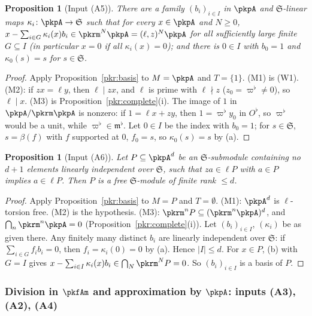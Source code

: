 \documentclass[10pt]{amsart}
\newtheorem{proposition}[theorem]{Proposition}
\theoremstyle{definition}
\theoremstyle{remark}
\begin{document}
\begin{proposition}[Input (A5)]\label{pkr:I5}
There are a family $(b_i)_{i\in I}$ in $\pkpA$ and $\mathfrak S$-linear maps $\kappa_i\colon\pkpA\to
\mathfrak S$ such that for every $x\in\pkpA$ and $N\ge0$, $x-\sum_{i\in G}\kappa_i(x)b_i\in
\pkrm^N\pkpA=(\ell,z)^N\pkpA$ for all sufficiently large finite $G\subseteq I$ (in particular $x=0$ if
all $\kappa_i(x)=0$); and there is $0\in I$ with $b_0=1$ and $\kappa_0(s)=s$ for $s\in\mathfrak S$.
\end{proposition}

\begin{proof}
Apply Proposition~\ref{pkr:basis} to $M=\pkpA$ and $T=\{1\}$. (M1) is (W1). (M2): if $zx=\ell y$, then
$\ell\mid zx$, and $\ell$ is prime with $\ell\nmid z$ ($z_0=\varpi^\flat\ne0$), so $\ell\mid x$. (M3) is
Proposition~\ref{pkr:complete}(i). The image of $1$ in $\pkpA/\pkrm\pkpA$ is nonzero: if $1=\ell
x+zy$, then $1=\varpi^\flat y_0$ in $O^\flat$, so $\varpi^\flat$ would be a unit, while
$\varpi^\flat\in\mathfrak m^\flat$. Let $0\in I$ be the index with $b_0=1$; for $s\in\mathfrak S$,
$s=\beta(f)$ with $f$ supported at $0$, $f_0=s$, so $\kappa_0(s)=s$ by (a).
\end{proof}

\begin{proposition}[Input (A6)]\label{pkr:I6}
Let $P\subseteq\pkpA^d$ be an $\mathfrak S$-submodule containing no $d+1$ elements linearly
independent over $\mathfrak S$, such that $za\in\ell P$ with $a\in P$ implies $a\in\ell P$. Then $P$
is a free $\mathfrak S$-module of finite rank $\le d$.
\end{proposition}

\begin{proof}
Apply Proposition~\ref{pkr:basis} to $M=P$ and $T=\emptyset$. (M1): $\pkpA^d$ is $\ell$-torsion free.
(M2) is the hypothesis. (M3): $\pkrm^nP\subseteq(\pkrm^n\pkpA)^d$, and $\bigcap_n\pkrm^n\pkpA=0$
(Proposition~\ref{pkr:complete}(i)). Let $(b_i)_{i\in I}$, $(\kappa_i)$ be as given there. Any finitely
many distinct $b_i$ are linearly independent over $\mathfrak S$: if $\sum_{i\in G}f_ib_i=0$, then
$f_i=\kappa_i(0)=0$ by (a). Hence $|I|\le d$. For $x\in P$, (b) with $G=I$ gives $x-\sum_{i\in I}
\kappa_i(x)b_i\in\bigcap_N\pkrm^NP=0$. So $(b_i)_{i\in I}$ is a basis of $P$.
\end{proof}

\subsubsection{Division in $\pkfAm$ and approximation by $\pkpA$: inputs (A3), (A2), (A4)}\label{pkr:ss-div}
\end{document}
